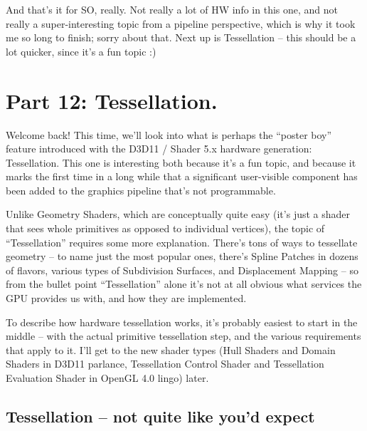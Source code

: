 \documentclass[12pt]{article}
\begin{document}
And that’s it for SO, really. Not really a lot of HW info in this one, and not really a super-interesting topic from a pipeline perspective, which is why it took me so long to finish; sorry about that. Next up is Tessellation – this should be a lot quicker, since it’s a fun topic :)

\section{Part 12: Tessellation.}
\label{sec:org5c36224}
\label{part12}

Welcome back! This time, we’ll look into what is perhaps the “poster boy” feature introduced with the D3D11 / Shader 5.x hardware generation: Tessellation. This one is interesting both because it’s a fun topic, and because it marks the first time in a long while that a significant user-visible component has been added to the graphics pipeline that’s not programmable.

Unlike Geometry Shaders, which are conceptually quite easy (it’s just a shader that sees whole primitives as opposed to individual vertices), the topic of “Tessellation” requires some more explanation. There’s tons of ways to tessellate geometry – to name just the most popular ones, there’s Spline Patches in dozens of flavors, various types of Subdivision Surfaces, and Displacement Mapping – so from the bullet point “Tessellation” alone it’s not at all obvious what services the GPU provides us with, and how they are implemented.

To describe how hardware tessellation works, it’s probably easiest to start in the middle – with the actual primitive tessellation step, and the various requirements that apply to it. I’ll get to the new shader types (Hull Shaders and Domain Shaders in D3D11 parlance, Tessellation Control Shader and Tessellation Evaluation Shader in OpenGL 4.0 lingo) later.

\subsection{Tessellation – not quite like you’d expect}
\label{sec:org37c75fd}
\end{document}
